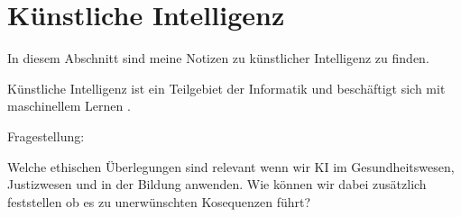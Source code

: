 \section{Künstliche Intelligenz}
\label{sec:ai}

In diesem Abschnitt sind meine Notizen zu künstlicher Intelligenz zu finden.

Künstliche Intelligenz ist ein Teilgebiet der Informatik und beschäftigt sich mit maschinellem Lernen \citep{ai-wikipedia}.

Fragestellung:

Welche ethischen Überlegungen sind relevant wenn wir KI im Gesundheitswesen, Justizwesen und in der Bildung anwenden. 
Wie können wir dabei zusätzlich feststellen ob es zu unerwünschten Kosequenzen führt?